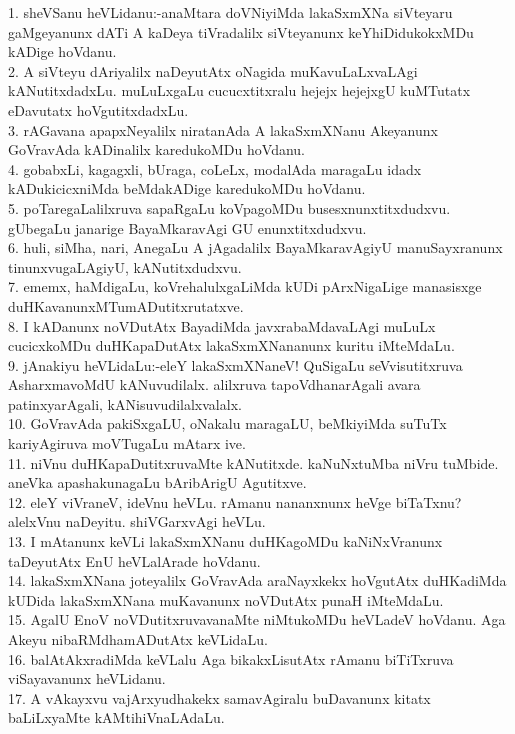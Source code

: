 \documentclass{article}
\begin{document}
1. sheVSanu heVLidanu:-anaMtara doVNiyiMda lakaSxmXNa siVteyaru gaMgeyanunx dATi A kaDeya tiVradalilx siVteyanunx keYhiDidukokxMDu kADige hoVdanu.\\
2. A siVteyu dAriyalilx naDeyutAtx oNagida muKavuLaLxvaLAgi kANutitxdadxLu. muLuLxgaLu cucucxtitxralu hejejx hejejxgU kuMTutatx eDavutatx hoVgutitxdadxLu.\\
3. rAGavana apapxNeyalilx niratanAda A lakaSxmXNanu Akeyanunx GoVravAda kADinalilx karedukoMDu hoVdanu.\\
4. gobabxLi, kagagxli, bUraga, coLeLx, modalAda maragaLu idadx kADukicicxniMda beMdakADige karedukoMDu hoVdanu.\\
5. poTaregaLalilxruva sapaRgaLu koVpagoMDu busesxnunxtitxdudxvu. gUbegaLu janarige BayaMkaravAgi GU enunxtitxdudxvu.\\
6. huli, siMha, nari, AnegaLu A jAgadalilx BayaMkaravAgiyU manuSayxranunx tinunxvugaLAgiyU, kANutitxdudxvu.\\
7. ememx, haMdigaLu, koVrehalulxgaLiMda kUDi pArxNigaLige manasisxge duHKavanunxMTumADutitxrutatxve.\\
8. I kADanunx noVDutAtx BayadiMda javxrabaMdavaLAgi muLuLx cucicxkoMDu duHKapaDutAtx lakaSxmXNananunx kuritu iMteMdaLu.\\
9. jAnakiyu heVLidaLu:-eleY lakaSxmXNaneV! QuSigaLu seVvisutitxruva AsharxmavoMdU kANuvudilalx. alilxruva tapoVdhanarAgali avara patinxyarAgali, kANisuvudilalxvalalx.\\
10. GoVravAda pakiSxgaLU, oNakalu maragaLU, beMkiyiMda suTuTx kariyAgiruva moVTugaLu mAtarx ive.\\
11. niVnu duHKapaDutitxruvaMte kANutitxde. kaNuNxtuMba niVru tuMbide. aneVka apashakunagaLu bAribArigU Agutitxve.\\
12. eleY viVraneV, ideVnu heVLu. rAmanu nananxnunx heVge biTaTxnu? alelxVnu naDeyitu. shiVGarxvAgi heVLu.\\
13. I mAtanunx keVLi lakaSxmXNanu duHKagoMDu kaNiNxVranunx taDeyutAtx EnU heVLalArade hoVdanu.\\
14. lakaSxmXNana joteyalilx GoVravAda araNayxkekx hoVgutAtx duHKadiMda kUDida lakaSxmXNana muKavanunx noVDutAtx punaH iMteMdaLu.\\
15. AgalU EnoV noVDutitxruvavanaMte niMtukoMDu heVLadeV hoVdanu. Aga Akeyu nibaRMdhamADutAtx keVLidaLu.\\
16. balAtAkxradiMda keVLalu Aga bikakxLisutAtx rAmanu biTiTxruva viSayavanunx heVLidanu.\\
17. A vAkayxvu vajArxyudhakekx samavAgiralu buDavanunx kitatx baLiLxyaMte kAMtihiVnaLAdaLu.\\
\end{document}
